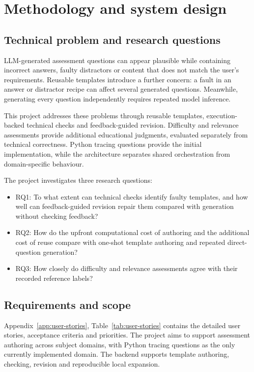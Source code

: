 \section{Methodology and system design}\label{sec:methodology}

\subsection{Technical problem and research questions}\label{sec:problem}

LLM-generated assessment questions can appear plausible while containing incorrect answers, faulty distractors or content that does not match the user's requirements. Reusable templates introduce a further concern: a fault in an answer or distractor recipe can affect several generated questions. Meanwhile, generating every question independently requires repeated model inference.

This project addresses these problems through reusable templates, execution-backed technical checks and feedback-guided revision. Difficulty and relevance assessments provide additional educational judgments, evaluated separately from technical correctness. Python tracing questions provide the initial implementation, while the architecture separates shared orchestration from domain-specific behaviour.

The project investigates three research questions:

\begin{itemize}
\item RQ1: To what extent can technical checks identify faulty templates, and how well can feedback-guided revision repair them compared with generation without checking feedback?
\item RQ2: How do the upfront computational cost of authoring and the additional cost of reuse compare with one-shot template authoring and repeated direct-question generation?
\item RQ3: How closely do difficulty and relevance assessments agree with their recorded reference labels?
\end{itemize}

\subsection{Requirements and scope}\label{sec:scope}

Appendix~\ref{app:user-stories}, Table~\ref{tab:user-stories} contains the detailed user stories, acceptance criteria and priorities. The project aims to support assessment authoring across subject domains, with Python tracing questions as the only currently implemented domain. The backend supports template authoring, checking, revision and reproducible local expansion.

